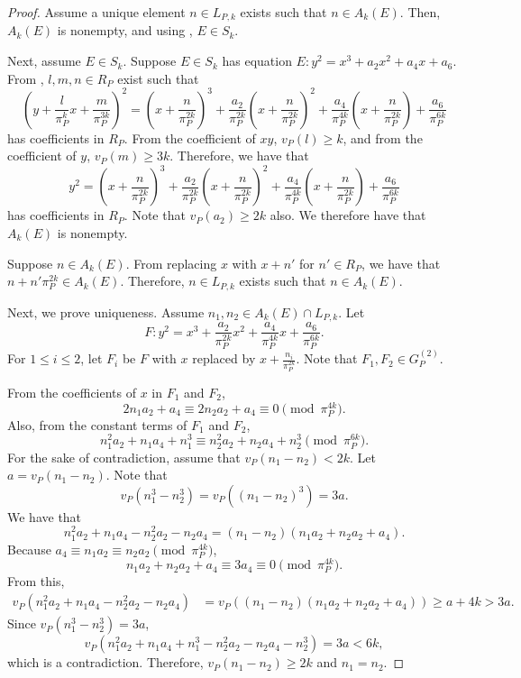 \documentclass[12pt,letterpaper]{amsart}
\theoremstyle{definition}
\begin{document}
\begin{proof}
Assume a unique element $n\in L_{P,k}$ exists such that $n\in A_k(E)$. Then, $A_k(E)$ is nonempty, and using , $E\in S_k$.

Next, assume $E\in S_k$. Suppose $E\in S_k$ has equation $E:y^2=x^3+a_2x^2+a_4x+a_6$. From , $l,m,n\in R_P$ exist such that
\[
    \left(y+\frac{l}{\pi_P^k}x+\frac{m}{\pi_P^{3k}}\right)^2=\left(x+\frac{n}{\pi_P^{2k}}\right)^3+\frac{a_2}{\pi_P^{2k}}\left(x+\frac{n}{\pi_P^{2k}}\right)^2+\frac{a_4}{\pi_P^{4k}}\left(x+\frac{n}{\pi_P^{2k}}\right)+\frac{a_6}{\pi_P^{6k}}
\]
has coefficients in $R_P$. From the coefficient of $xy$, $v_P(l)\geq k$, and from the coefficient of $y$, $v_P(m)\geq 3k$. Therefore, we have that
\[
y^2=\left(x+\frac{n}{\pi_P^{2k}}\right)^3+\frac{a_2}{\pi_P^{2k}}\left(x+\frac{n}{\pi_P^{2k}}\right)^2+\frac{a_4}{\pi_P^{4k}}\left(x+\frac{n}{\pi_P^{2k}}\right)+\frac{a_6}{\pi_P^{6k}}
\]
has coefficients in $R_P$. Note that $v_P(a_2)\geq 2k$ also. We therefore have that $A_k(E)$ is nonempty. 

Suppose $n\in A_k(E)$. From replacing $x$ with $x+n'$ for $n'\in R_P$, we have that $n+n'\pi_P^{2k}\in A_k(E)$. Therefore, $n\in L_{P,k}$ exists such that $n\in A_k(E)$.

Next, we prove uniqueness. Assume $n_1,n_2\in A_k(E)\cap L_{P,k}$. Let
\[
F:y^2=x^3+\frac{a_2}{\pi_P^{2k}}x^2+\frac{a_4}{\pi_P^{4k}}x+\frac{a_6}{\pi_P^{6k}}.
\]
For $1\leq i\leq 2$, let $F_i$ be $F$ with $x$ replaced by $x+\frac{n_i}{\pi_P^{2k}}$. Note that $F_1,F_2\in G_P^{(2)}$. 

From the coefficients of $x$ in $F_1$ and $F_2$, 
\[
2n_1a_2+a_4\equiv 2n_2a_2+a_4\equiv 0\pmod{\pi_P^{4k}}.
\]
Also, from the constant terms of $F_1$ and $F_2$,
\[
n_1^2a_2+n_1a_4+n_1^3 \equiv n_2^2a_2+n_2a_4+n_2^3\pmod{\pi_P^{6k}}.
\]
For the sake of contradiction, assume that $v_P(n_1-n_2)<2k$. Let $a=v_P(n_1-n_2)$. Note that 
\[
v_P(n_1^3-n_2^3)=v_P((n_1-n_2)^3)=3a.
\]
We have that
\[
n_1^2a_2+n_1a_4-n_2^2a_2-n_2a_4=(n_1-n_2)(n_1a_2+n_2a_2+a_4).
\]
Because $a_4\equiv n_1a_2\equiv n_2a_2\pmod{\pi_P^{4k}}$, 
\[
n_1a_2+n_2a_2+a_4\equiv 3a_4\equiv 0\pmod{\pi_P^{4k}}.
\]
From this,
\begin{align*}
v_P(n_1^2a_2+n_1a_4-n_2^2a_2-n_2a_4) & =
v_P((n_1-n_2)(n_1a_2+n_2a_2+a_4))
\geq a+4k>3a.
\end{align*}
Since $v_P(n_1^3-n_2^3)=3a$,
\[
v_P(n_1^2a_2+n_1a_4+n_1^3-n_2^2a_2-n_2a_4-n_2^3)=3a<6k, 
\]
which is a contradiction. Therefore, $v_P(n_1-n_2)\geq 2k$ and $n_1=n_2$.
\end{proof}
\end{document}
